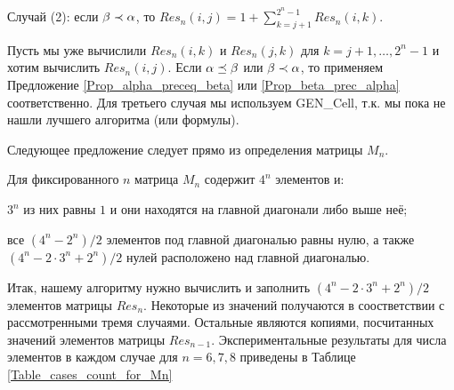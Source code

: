 \begin{Proposition}\label{Prop_beta_prec_alpha}
 Случай (2): если $\beta \prec \alpha$, то 
 $Res_n(i,j) = 1 + \sum\limits^{2^n-1}_{k=j+1} Res_n(i,k)$. 
\end{Proposition}

  Пусть мы уже вычислили $Res_n(i,k)$ и $Res_n(j,k)$ для $k=j+1, \dots, 2^n-1$ и хотим вычислить $Res_n(i,j)$.
Если $\alpha \preceq \beta$ или $\beta \prec \alpha$, то применяем Предложение \ref{Prop_alpha_preceq_beta} или \ref{Prop_beta_prec_alpha} 
соответственно.
Для третьего случая мы используем GEN\_Cell, т.к. мы пока не нашли лучшего алгоритма (или формулы).\par
Следующее предложение следует прямо из определения матрицы $M_n$.

\begin{Proposition}\label{Prop_elements_in_Mn}
Для фиксированного $n$ матрица $M_n$ содержит $4^n$ элементов и:
	\begin{list}{)}{} 
	\item $3^n$ из них равны $1$ и они находятся на главной диагонали либо выше неё;
	\item все $(4^n-2^n)/2$ элементов под главной диагональю равны нулю, а также 
	$(4^n - 2\cdot3^n + 2^n)/2$ нулей расположено над главной диагональю.
	\end{list}
\end{Proposition}
Итак, нашему алгоритму нужно вычислить и заполнить $(4^n - 2\cdot3^n + 2^n)/2$ элементов матрицы $Res_n$.
Некоторые из значений получаются в соостветствии с рассмотренными тремя случаями. 
Остальные являются копиями, 
посчитанных значений элементов матрицы $Res_{n-1}$.
Экспериментальные результаты для числа элементов в каждом 
случае для $n=6,7,8$ приведены в Таблице \ref{Table_cases_count_for_Mn}


